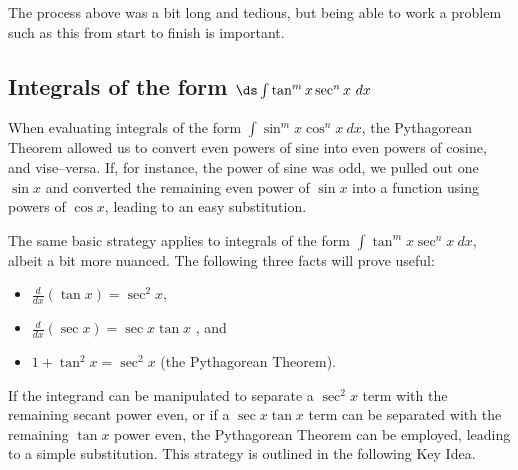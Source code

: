 The process above was a bit long and tedious, but being able to work a problem such as this from start to finish is important.

\subsection{\texorpdfstring{Integrals of the form $\ds\int\tan^mx\sec^nx\ dx$}{Integrands of the form (tan x)\^{}m (sec x)\^{}n}}

When evaluating integrals of the form $\int \sin^mx\cos^nx\ dx$, the Pythagorean Theorem allowed us to convert even powers of sine into even powers of cosine, and vise--versa. If, for instance, the power of sine was odd, we pulled out one $\sin x$ and converted the remaining even power of $\sin x$ into a function using powers of $\cos x$, leading to an easy substitution.

The same basic strategy applies to integrals of the form $\int \tan^mx\sec^n x\ dx$, albeit a bit more nuanced. The following three facts will prove useful:
\begin{itemize}
\item $\frac{d}{dx}(\tan x) = \sec^2x$, 
\item $\frac{d}{dx}(\sec x) = \sec x\tan x$ , and 
\item	$1+\tan^2x = \sec^2x$ (the Pythagorean Theorem).
\end{itemize}

If the integrand can be manipulated to separate a $\sec^2x$ term with the remaining secant power even, or if a $\sec x\tan x$ term can be separated with the remaining $\tan x$ power even, the Pythagorean Theorem can be employed, leading to a simple substitution. This strategy is outlined in the following Key Idea.

